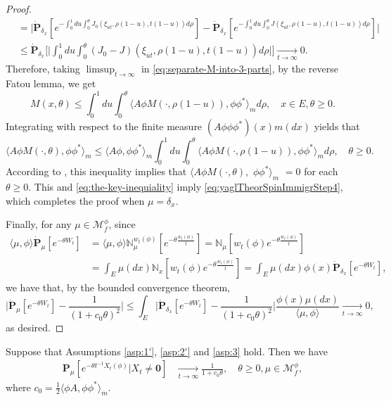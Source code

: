 \begin{proof}
\[\begin{split}
	&=\big|\dot{\mathbf P}_{\delta_x}[e^{-\int_0^1 du\int_0^{\theta} J_0(\xi_{ut},\rho(1-u),t(1-u)) d\rho }]-\dot{\mathbf P}_{\delta_x}[e^{-\int_0^1 du\int_0^{\theta} J(\xi_{ut},\rho(1-u),t(1-u)) d\rho }]\big|\\
	&\leq \dot{\mathbf P}_{\delta_x}\Big[\Big|\int_0^1du\int_0^\theta (J_0-J)(\xi_{ut},\rho(1-u),t(1-u))d\rho\Big|\Big]
	\xrightarrow[t\to\infty]{} 0.
\end{split}\]
	Therefore, taking $\limsup_{t\to\infty}$ in \eqref{eq:separate-M-into-3-parts}, by the reverse Fatou lemma, we get
\begin{equation}\label{eq:the-key-inequiality}
	M(x,\theta)
	\leq \int_0^1du\int_0^\theta \langle  A\phi M(\cdot,\rho(1-u)),\phi\phi^*\rangle_m d\rho,
	\quad x\in E,\theta\geq 0.
\end{equation}
	Integrating with respect to the finite measure $(A\phi\phi\phi^*)(x)m(dx)$ yields that
\[
	\langle  A\phi M(\cdot,\theta),\phi\phi^*\rangle_m
	\leq \langle A\phi,\phi\phi^*\rangle_m\int_0^1du\int_0^\theta \langle  A\phi M(\cdot,\rho(1-u)),\phi\phi^*\rangle_m d\rho,
	\quad \theta\geq 0.
\]
	According to \cite[Lemma 3.1]{RenSongSun2018A-2-spine}, this inequality implies that $\langle A\phi M(\cdot,\theta),$ $\phi\phi^*\rangle_m$ $ =0$ for each $ \theta\geq 0$.
	This and \eqref{eq:the-key-inequiality} imply \eqref{eq:yaglTheorSpinImmigrStep4}, which completes the proof when $\mu=\delta_x$.
\par
	Finally, for any $\mu \in \mathcal M^\phi_f$, since
\[\begin{split}
	\langle \mu,\phi\rangle\dot {\mathbf P}_\mu [e^{-\theta W_t}]
	&=\langle\mu,\phi\rangle\mathbb N^{w_t(\phi)}_\mu[e^{-\theta \frac{w_t(\phi)}{t}}]
	=\mathbb N_\mu [w_t(\phi)e^{-\theta \frac{w_t(\phi)}{t}}]\\
	&=\int_E\mu(dx)\mathbb N_x[w_t(\phi)e^{-\theta\frac{w_t(\phi)}{t}}]
	=\int_E \mu(dx) \phi(x) \dot{\mathbf P}_{\delta_x}[e^{-\theta W_t}],
\end{split}\]
	we have that, by the bounded convergence theorem,
\[
	\big|\dot {\mathbf P}_\mu[e^{-\theta W_t}] - \frac{1}{(1+c_0\theta)^2}\big|
	\leq \int_E \big|\dot {\mathbf P}_{\delta_x}[e^{-\theta W_t}]-\frac{1}{(1+c_0\theta)^2}\big| \frac{\phi(x)\mu(dx)}{\langle\mu,\phi\rangle}
	\xrightarrow[t\to\infty]{} 0,
\]
	as desired.	
\end{proof}
\begin{lem}\label{lem:Yaglom-for-phi}
	Suppose that Assumptions \ref{asp:1'}, \ref{asp:2'} and \ref{asp:3} hold.
	Then we have
\[\begin{split}
	\mathbf P_\mu[e^{-\theta t^{-1}X_t(\phi)} |X_t\neq\mathbf 0]
	&\xrightarrow[t\to\infty]{}\frac{1}{1+c_0\theta},
	\quad \theta\geq 0, \mu\in \mathcal M_f^\phi,
\end{split}\]
	where $c_0 = \frac{1}{2}\langle\phi A,\phi\phi^*\rangle_m$.
\end{lem}
